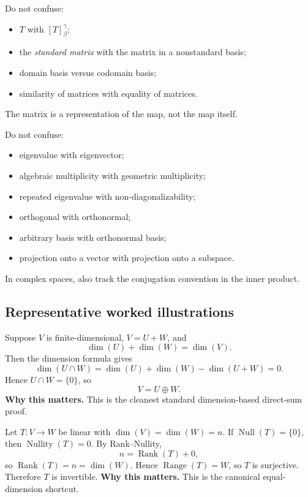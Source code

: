 \begin{commonmistake}[title={Common Mistake Cluster II: maps and matrices}]
Do not confuse:
\begin{itemize}[leftmargin=*]
    \item \(T\) with \([T]^\gamma_\beta\);
    \item the \emph{standard matrix} with the matrix in a nonstandard basis;
    \item domain basis versus codomain basis;
    \item similarity of matrices with equality of matrices.
\end{itemize}
The matrix is a representation of the map, not the map itself.
\end{commonmistake}

\begin{commonmistake}[title={Common Mistake Cluster III: spectral and inner-product issues}]
Do not confuse:
\begin{itemize}[leftmargin=*]
    \item eigenvalue with eigenvector;
    \item algebraic multiplicity with geometric multiplicity;
    \item repeated eigenvalue with non-diagonalizability;
    \item orthogonal with orthonormal;
    \item arbitrary basis with orthonormal basis;
    \item projection onto a vector with projection onto a subspace.
\end{itemize}
In complex spaces, also track the conjugation convention in the inner product.
\end{commonmistake}

\subsection{Representative worked illustrations}

\begin{examplebox}[title={Worked Illustration 1: proving a direct sum by dimensions}]
Suppose \(V\) is finite-dimensional, \(V=U+W\), and
\[
\dim(U)+\dim(W)=\dim(V).
\]
Then the dimension formula gives
\[
\dim(U\cap W)=\dim(U)+\dim(W)-\dim(U+W)=0.
\]
Hence \(U\cap W=\{0\}\), so
\[
V=U\oplus W.
\]
\textbf{Why this matters.} This is the cleanest standard dimension-based direct-sum proof.
\end{examplebox}

\begin{examplebox}[title={Worked Illustration 2: injective versus surjective via Rank--Nullity}]
Let \(T:V\to W\) be linear with \(\dim(V)=\dim(W)=n\). If \(\operatorname{Null}(T)=\{0\}\), then \(\operatorname{Nullity}(T)=0\). By Rank--Nullity,
\[
n=\operatorname{Rank}(T)+0,
\]
so \(\operatorname{Rank}(T)=n=\dim(W)\). Hence \(\operatorname{Range}(T)=W\), so \(T\) is surjective. Therefore \(T\) is invertible.
\textbf{Why this matters.} This is the canonical equal-dimension shortcut.
\end{examplebox}

